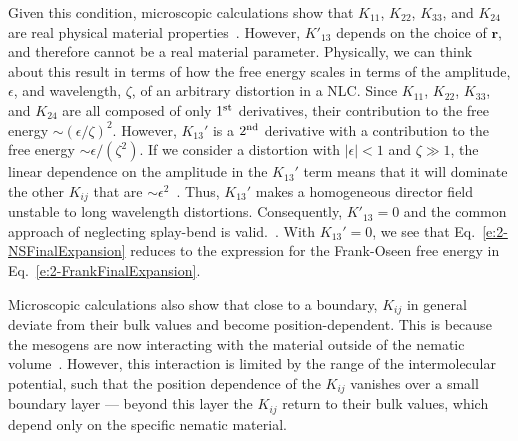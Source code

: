 Given this condition, microscopic calculations show that $K_{11}$, $K_{22}$, $K_{33}$, and $K_{24}$ are real physical material properties~\cite{RN55,RN56,RN225,RN224,RN217,RN222}.
However, $K'_{13}$ depends on the choice of $\mathbf{r}$, and therefore cannot be a real material parameter.
Physically, we can think about this result in terms of how the free energy scales in terms of the amplitude, $\epsilon$, and wavelength, $\zeta$, of an arbitrary distortion in a NLC.
Since $K_{11}$, $K_{22}$, $K_{33}$, and $K_{24}$ are all composed of only $1^{\rm st}$ derivatives, their contribution to the free energy $\sim (\epsilon/\zeta)^2$.
However, $K_{13}'$ is a $2^{\rm nd}$ derivative with a contribution to the free energy $\sim \epsilon/(\zeta^2)$.
If we consider a distortion with $|\epsilon| <1$ and $\zeta \gg 1$, the linear dependence on the amplitude in the $K_{13}'$ term means that it will dominate the other $K_{ij}$ that are $\sim \epsilon^2$~\cite{RN55}.
Thus, $K_{13}'$ makes a homogeneous director field unstable to long wavelength distortions.
Consequently, $K'_{13} = 0$ and the common approach of neglecting splay-bend is valid.~\cite{RN55,RN225}.
With $K_{13}'=0$, we see that Eq.~\ref{e:2-NSFinalExpansion} reduces to the expression for the Frank-Oseen free energy in Eq.~\ref{e:2-FrankFinalExpansion}.

Microscopic calculations also show that close to a boundary, $K_{ij}$ in general deviate from their bulk values and become position-dependent.
This is because the mesogens are now interacting with the material outside of the nematic volume~\cite{RN56,RN57,RN55}.
However, this interaction is limited by the range of the intermolecular potential, such that the position dependence of the $K_{ij}$ vanishes over a small boundary layer --- beyond this layer the $K_{ij}$ return to their bulk values, which depend only on the specific nematic material.

